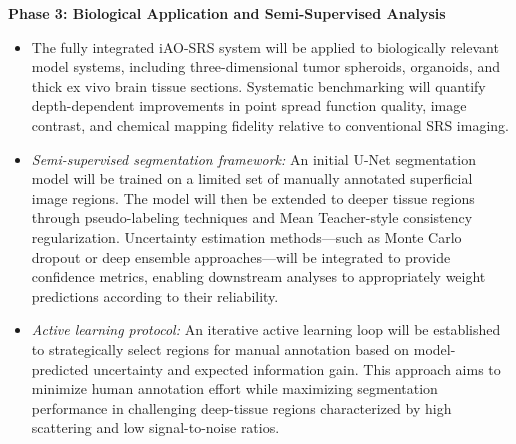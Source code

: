 \documentclass[12pt,a4paper]{article}
\begin{document}
\textbf{Phase 3: Biological Application and Semi-Supervised Analysis}
\begin{itemize}
  \item The fully integrated iAO-SRS system will be applied to biologically relevant model systems, including three-dimensional tumor spheroids, organoids, and thick ex vivo brain tissue sections. Systematic benchmarking will quantify depth-dependent improvements in point spread function quality, image contrast, and chemical mapping fidelity relative to conventional SRS imaging.
  \item \textit{Semi-supervised segmentation framework:} An initial U-Net segmentation model will be trained on a limited set of manually annotated superficial image regions. The model will then be extended to deeper tissue regions through pseudo-labeling techniques and Mean Teacher-style consistency regularization. Uncertainty estimation methods—such as Monte Carlo dropout or deep ensemble approaches—will be integrated to provide confidence metrics, enabling downstream analyses to appropriately weight predictions according to their reliability.
  \item \textit{Active learning protocol:} An iterative active learning loop will be established to strategically select regions for manual annotation based on model-predicted uncertainty and expected information gain. This approach aims to minimize human annotation effort while maximizing segmentation performance in challenging deep-tissue regions characterized by high scattering and low signal-to-noise ratios.
\end{itemize}
\end{document}

